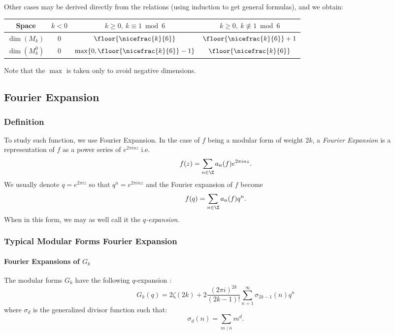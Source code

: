 Other cases may be derived directly from the relations (using induction to get general formulas), and we obtain:

\begin{center}
\begin{tabular}{||c||c|c|c||} 
    \hline
    Space & $k<0$ & $k \geq 0, \ k \equiv 1 \bmod 6$ & $k \geq 0, \ k \not \equiv 1 \bmod 6$ \\
    \hline
    \hline
    $\dim(M_k)$ & $0$ & $\floor{\nicefrac{k}{6}}$ & $\floor{\nicefrac{k}{6}} + 1$ \\
    \hline
    $\dim(M_k^0)$ & $0$ & $\max\{0, \floor{\nicefrac{k}{6}} - 1\}$ & $\floor{\nicefrac{k}{6}}$ \\
    \hline
\end{tabular}
\end{center}
Note that the $\max$ is taken only to avoid negative dimensions.



\subsection{Fourier Expansion}
\subsubsection{Definition}
To study such function, we use Fourier Expansion.
In the case of $f$ being a modular form of weight $2k$, 
a \textit{Fourier Expansion} is a representation of $f$ as a power series of $e^{2\pi i n z}$
i.e. $$f(z) = \sum_{n \in \Z} a_n(f) e^{2\pi inz}.$$
We usually denote $q = e^{2\pi i z}$ so that $q^n = e^{2\pi i n z}$ 
and the Fourier expansion of $f$ become 
$$
f(q) = \sum_{n \in \Z} a_n(f) q^n.
$$
When in this form, we may as well call it the \textit{$q$-expansion}.

\subsubsection{Typical Modular Forms Fourier Expansion}
\paragraph{Fourier Expansions of $G_k$}
The modular forms $G_k$ have the following $q$-expansion \cite[p.92]{CourseInArithmetic}:
$$
G_k(q) = 2\zeta(2k) + 2 \frac{{(2 \pi i)}^{2k}}{(2k-1)!} \sum_{n=1}^{\infty} \sigma_{2k-1}(n)q^n
$$
where $\sigma_d$ is the generalized divisor function such that:
$$
\sigma_d(n) = \sum_{m \mid n} m^d
.$$

